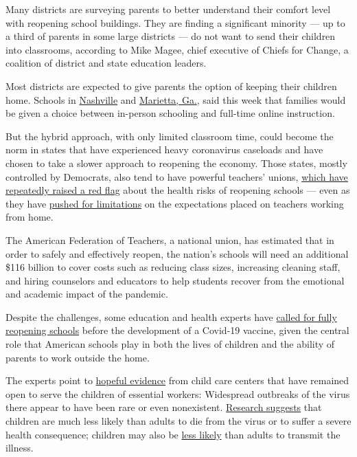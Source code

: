 Many districts are surveying parents to better understand their comfort
level with reopening school buildings. They are finding a significant
minority --- up to a third of parents in some large districts --- do not
want to send their children into classrooms, according to Mike Magee,
chief executive of Chiefs for Change, a coalition of district and state
education leaders.

Most districts are expected to give parents the option of keeping their
children home. Schools in
\href{https://www.tennessean.com/story/news/education/2020/06/26/metro-nashville-parents-have-choose-between-person-remote-learning-fall/3264076001/}{Nashville}
and \href{https://www.marietta-city.org/reopening}{Marietta, Ga.}, said
this week that families would be given a choice between in-person
schooling and full-time online instruction.

But the hybrid approach, with only limited classroom time, could become
the norm in states that have experienced heavy coronavirus caseloads and
have chosen to take a slower approach to reopening the economy. Those
states, mostly controlled by Democrats, also tend to have powerful
teachers' unions,
\href{https://www.nydailynews.com/opinion/ny-oped-teachers-will-return-in-the-fall-if-20200626-bu5nvsmx6zdqjfeppetepjnk2i-story.html}{which
have repeatedly raised a red flag} about the health risks of reopening
schools --- even as they have
\href{https://www.nytimes3xbfgragh.onion/2020/04/21/us/coronavirus-teachers-unions-school-home.html}{pushed
for limitations} on the expectations placed on teachers working from
home.

The American Federation of Teachers, a national union, has estimated
that in order to safely and effectively reopen, the nation's schools
will need an additional \$116 billion to cover costs such as reducing
class sizes, increasing cleaning staff, and hiring counselors and
educators to help students recover from the emotional and academic
impact of the pandemic.

Despite the challenges, some education and health experts have
\href{https://jamanetwork.com/journals/jamapediatrics/fullarticle/2766113}{called
for fully reopening schools} before the development of a Covid-19
vaccine, given the central role that American schools play in both the
lives of children and the ability of parents to work outside the home.

The experts point to
\href{https://www.npr.org/2020/06/24/882316641/what-parents-can-learn-from-child-care-centers-that-stayed-open-during-lockdowns}{hopeful
evidence} from child care centers that have remained open to serve the
children of essential workers: Widespread outbreaks of the virus there
appear to have been rare or even nonexistent.
\href{https://www.thelancet.com/journals/lanchi/article/PIIS2352-4642(20)30177-2/fulltext}{Research
suggests} that children are much less likely than adults to die from the
virus or to suffer a severe health consequence; children may also be
\href{http://ncirs.org.au/sites/default/files/2020-04/NCIRS\%20NSW\%20Schools\%20COVID_Summary_FINAL\%20public_26\%20April\%202020.pdf?fbclid=IwAR3oiRE3aeW_iDVBO8ilXa7VdkBMYLcV89pknobZx-cvtlumLQ-FSRwLEDg}{less
likely} than adults to transmit the illness.

